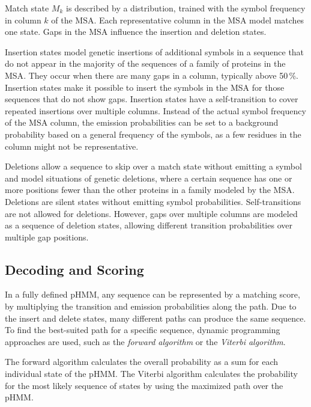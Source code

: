 Match state $M_k$ is described by a distribution, trained with the symbol frequency in column $k$ of the \ac{MSA}. Each representative column in the \ac{MSA} model matches one state. Gaps in the MSA influence the insertion and deletion states.

Insertion states model genetic insertions of additional symbols in a sequence that do not appear in the majority of the sequences of a family of proteins in the \ac{MSA}.
They occur when there are many gaps in a column, typically above 50\,\%. Insertion states  make it possible to insert the symbols in the \ac{MSA} for those sequences that do not show gaps.
Insertion states have a self-transition to cover repeated insertions over multiple columns. 
Instead of the actual symbol frequency of the \ac{MSA} column, the emission probabilities can be set to a background probability based on a general frequency of the symbols, as a few residues in the column might not be representative.

Deletions allow a sequence to skip over a match state without emitting a symbol and model situations of genetic deletions, where a certain sequence has one or more positions fewer than the other proteins in a family modeled by the \ac{MSA}.
Deletions are silent states without emitting symbol probabilities. Self-transitions are not allowed  for deletions. However, gaps over multiple columns are modeled as a sequence of deletion states, allowing different transition probabilities over multiple gap positions.


\subsection{Decoding and Scoring}
\label{sec:scoringTh}

In a fully defined \ac{pHMM}, any sequence can be represented by a matching score, by multiplying the transition and emission probabilities along the path. Due to the insert and delete states, many different paths can produce the same sequence. To find the \mbox{best-suited} path for a specific sequence, dynamic programming approaches are used, such as the \textit{forward algorithm} or the \textit{Viterbi algorithm}.

The forward algorithm calculates the overall probability as a sum for each individual state of the \ac{pHMM}. 
The Viterbi algorithm calculates the probability for the most likely sequence of states by using the maximized path over the \ac{pHMM}.

